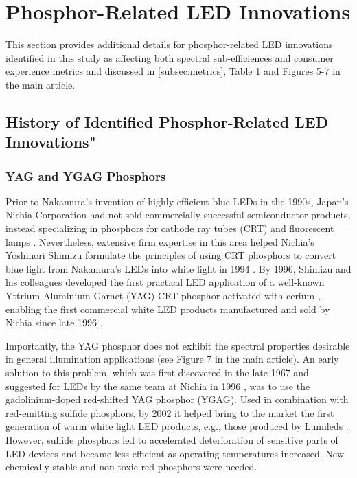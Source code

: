 \documentclass[10pt]{article}
\begin{document}
\section{Phosphor-Related LED Innovations}
\label{sec:innovation_phosphor}

This section provides additional details for phosphor-related LED innovations identified in this study as affecting both spectral sub-efficiences and consumer experience metrics and discussed in \cref{subsec:metrics}, Table 1 and Figures 5-7 in the main article. 

\subsection{History of Identified Phosphor-Related LED Innovations"}

\subsubsection{YAG and YGAG Phosphors}

Prior to Nakamura’s invention of highly efficient blue LEDs in the 1990s, Japan’s Nichia Corporation had not sold commercially successful semiconductor products, instead specializing in phosphors for cathode ray tubes (CRT) and fluorescent lamps \cite{nakamura2013blue}  . Nevertheless, extensive firm expertise in this area helped Nichia’s Yoshinori Shimizu formulate the principles of using CRT phosphors to convert blue light from Nakamura’s LEDs into white light in 1994 \cite{shimizu1994sheet}\cite{cho2017white}. By 1996, Shimizu and his colleagues developed \cite{bando1996}\cite{shimizu1999light} the first practical LED application of a well-known Yttrium Aluminium Garnet (YAG) CRT phosphor activated with cerium \cite{blasse1967new}, enabling the first commercial white LED products manufactured and sold by Nichia since late 1996 \cite{bando1998development}\cite{cho2017white}. 

Importantly, the YAG phosphor does not exhibit the spectral properties desirable in general illumination applications (see Figure 7 in the main article). An early solution to this problem, which was first discovered in the late 1967 \cite{holloway1969optical} and suggested for LEDs by the same team at Nichia in 1996 \cite{bando1998development}\cite{shimizu1999light}, was to use the gadolinium-doped red-shifted YAG phosphor (YGAG). Used in combination with red-emitting sulfide phosphors, by 2002 it helped bring to the market the first generation of warm white light LED products, e.g., those produced by Lumileds \cite{Mueller2002}. However, sulfide phosphors led to accelerated deterioration of sensitive parts of LED devices and became less efficient as operating temperatures increased. New chemically stable and non-toxic red phosphors were needed. 
\end{document}
